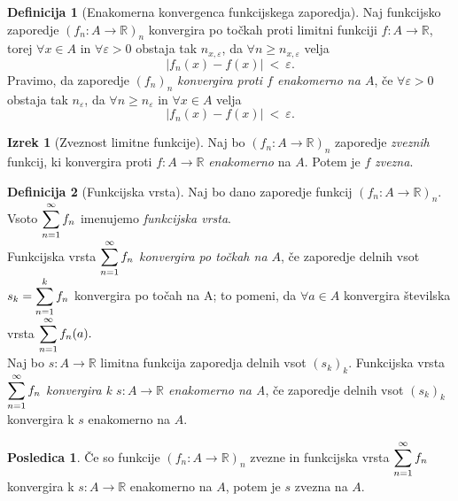 \documentclass[11pt]{article}
\newcommand{\R}{\mathbb{R}}
\theoremstyle{definition}
\newtheorem{definicija}{Definicija}[section]
\theoremstyle{definition}
\theoremstyle{definition}
\newtheorem{izrek}{Izrek}[section]
\theoremstyle{theorem}
\newtheorem*{posledica}{Posledica}
\begin{document}
\begin{definicija}[Enakomerna konvergenca funkcijskega zaporedja]

Naj \hbox{funkcijsko} zaporedje $(f_n: A \rightarrow \mathbb{R})_n$ konvergira po točkah proti limitni funkciji \hbox{$f: A \rightarrow \mathbb{R}$}, torej $\forall x \in A$ in $\forall \varepsilon > 0$ obstaja tak $n_{x,\varepsilon}$, da $\forall n \geq n_{x,\varepsilon}$ velja 
$$|f_n(x) - f(x)| ~<~ \varepsilon.$$
Pravimo, da zaporedje $(f_n)_n$ \textit{konvergira proti $f$ enakomerno na $A$}, če $\forall  \varepsilon > 0$ obstaja tak $n_{\varepsilon}$, da $\forall n \geq n_{\varepsilon}$ in $\forall x \in A$ velja
$$|f_n(x) - f(x)| ~<~ \varepsilon.$$

\end{definicija}
\vspace{0.5cm}

\begin{izrek}[Zveznost limitne funkcije]

Naj bo $(f_n: A \rightarrow \R)_n$ zaporedje \textit{zveznih} funkcij, ki konvergira proti $f: A \rightarrow \R$ \textit{enakomerno} na $A$. Potem je $f$ \textit{zvezna}.

\end{izrek}
\vspace{0.5cm}

\begin{definicija}[Funkcijska vrsta]

Naj bo dano zaporedje funkcij \hbox{$(f_n: A \rightarrow \mathbb{R})_n$}. Vsoto $\mathlarger{\sum_{n=1}^{\infty} f_n}$ imenujemo \textit{funkcijska vrsta}. \\

Funkcijska vrsta $\mathlarger{\sum_{n=1}^{\infty} f_n}$ \textit{konvergira po točkah na $A$}, če zaporedje delnih vsot $s_k = \mathlarger{\sum_{n=1}^{k} f_n}$ konvergira po točah na A; to pomeni, da $\forall a \in A$ konvergira številska vrsta $\mathlarger{\sum_{n=1}^{\infty} f_n(a)}.$ \\

Naj bo $s: A \rightarrow \mathbb{R}$ limitna funkcija zaporedja delnih vsot $(s_k)_k$. \hbox{Funkcijska} vrsta $\mathlarger{\sum_{n=1}^{\infty}f_n}$ \textit{konvergira k $s: A \rightarrow \mathbb{R}$ enakomerno na A}, če zaporedje delnih vsot $(s_k)_k$ konvergira k $s$ enakomerno na $A$.
 

\end{definicija}
\vspace{0.5cm}

\begin{posledica}

Če so funkcije $(f_n: A \rightarrow \mathbb{R})_n$ zvezne in funkcijska vrsta $\mathlarger{\sum_{n=1}^{\infty} f_n}$ konvergira k $s: A \rightarrow \mathbb{R}$ enakomerno na $A$, potem je $s$ zvezna na $A$.

\end{posledica}
\vspace{0.5cm}
\end{document}
